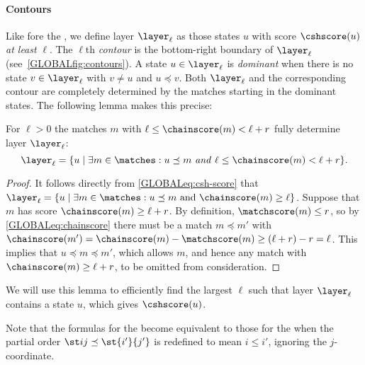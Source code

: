 \paragraph{Contours}
Like fore the \sh, we define layer $\layer_\ell$ as those states $u$ with score
$\cshscore(u)$ \emph{at least} $\ell$.
The $\ell$th \emph{contour} is
the bottom-right boundary of $\layer_\ell$ (see~\cref{GLOBALfig:contours}). A state
$u\in \layer_\ell$ is \emph{dominant} when there is no state $v\in \layer_\ell$ with
$v\neq u$ and $u\preceq v$. Both $\layer_\ell$ and the corresponding contour are completely
determined by the matches starting in the dominant states. The following lemma
makes this precise:
\begin{lem}\label{GLOBALlem:contour}
  For $\ell>0$
  the matches $m$ with $\ell \leq \chainscore(m) < \ell+r$ fully determine layer $\layer_\ell$:
  \begin{equation}
    \layer_\ell = \{u \mid \exists m\in \matches : u \preceq m \text{ \emph{and} } \ell \leq \chainscore(m) < \ell+r\}.
  \end{equation}
\end{lem}
\begin{proof}
  It follows directly from \cref{GLOBALeq:csh-score} that
  $\layer_\ell = \{u\mid \exists m\in \matches : u\preceq m \text{ and } \chainscore(m) \geq \ell\}$.
  Suppose that $m$ has score $\chainscore(m)\geq \ell+r$. By definition,
  $\matchscore(m) \leq r$, so by \cref{GLOBALeq:chainscore} there must be a match $m\preceq m'$ with
  $\chainscore(m') = \chainscore(m) - \matchscore(m) \geq (\ell+r)-r=\ell$. This implies that $u\preceq m\preceq m'$,
  which allows $m$, and hence any match with $\chainscore(m) \geq \ell+r$, to be omitted from consideration.
\end{proof}

We will use this lemma to efficiently find the largest $\ell$ such that layer
$\layer_\ell$ contains a state $u$, which gives $\cshscore(u)$.

Note that the formulas for the \csh become equivalent to those for the \sh when
the partial order ${\st ij\preceq\st{i'}{j'}}$ is redefined to mean $i \leq i'$,
ignoring the $j$-coordinate.
